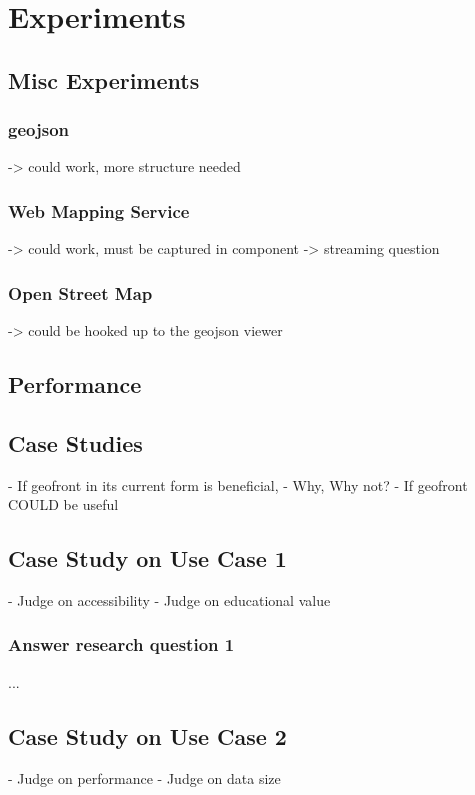 \chapter{Experiments}%


\section{ Misc Experiments }

\subsection{ geojson }
-> could work, more structure needed

\subsection{ Web Mapping Service }
-> could work, must be captured in component
-> streaming question

\subsection{ Open Street Map }
-> could be hooked up to the geojson viewer



\section{ Performance }

\section{ Case Studies } 
- If geofront in its current form is beneficial,
  - Why, Why not?
- If geofront COULD be useful

\section{Case Study on Use Case 1}%
- Judge on accessibility
- Judge on educational value

\subsection*{Answer research question 1}

...

\section{Case Study on Use Case 2}%
- Judge on performance
- Judge on data size


